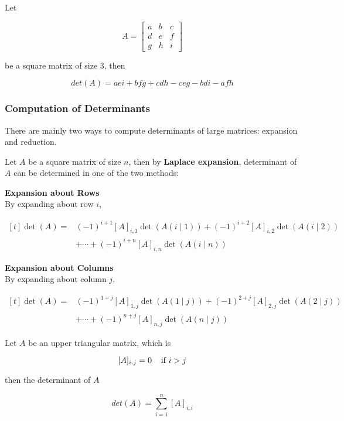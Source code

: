 \documentclass[a4paper,12pt]{article}
\begin{document}
\begin{thm}
  Let

  $$A=\begin{bmatrix}
    a & b & c\\
    d & e & f\\
    g & h & i
  \end{bmatrix}$$\s

  be a square matrix of size $3$, then
  
  $$det(A)=aei+bfg+cdh-ceg-bdi-afh$$\s
\end{thm}

\subsubsection{Computation of Determinants}
There are mainly two ways to compute determinants of large matrices: expansion and reduction.\n

\begin{thm}
  Let $A$ be a square matrix of size $n$, then by \textbf{Laplace expansion}, determinant of $A$ can be determined in one of the two methods:

  \begin{alist}
    \item \textbf{Expansion about Rows}\\
    By expanding about row $i$,
  
    $$\begin{aligned}[t]
      \det(A)=&(-1)^{i+1}[A]_{i,1}\det(A(i\!\mid\!1))+(-1)^{i+2}[A]_{i,2}\det(A(i\!\mid\!2))\\
      &+\cdots+(-1)^{i+n}[A]_{i,n}\det(A(i\!\mid\!n))
    \end{aligned}$$
  
    \item \textbf{Expansion about Columns}\\
    By expanding about column $j$,
  
    $$\begin{aligned}[t]
      \det(A)=&(-1)^{1+j}[A]_{1,j}\det(A(1\!\mid\!j))+(-1)^{2+j}[A]_{2,j}\det(A(2\!\mid\!j))\\
      &+\cdots+(-1)^{n+j}[A]_{n,j}\det(A(n\!\mid\!j))
    \end{aligned}$$
  
  \end{alist}
\end{thm}\n

\begin{thm}
  Let $A$ be an upper triangular matrix, which is

  $$[A]_{i,j}=0\;\;\;\;\text{if }i>j$$\s

  then the determinant of $A$

  $$det(A)=\sum_{i=1}^{n}[A]_{i,i}$$
\end{thm}\n
\end{document}
